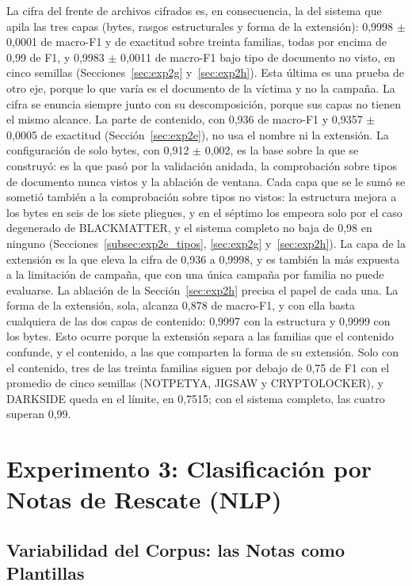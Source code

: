 La cifra del frente de archivos cifrados es, en consecuencia, la del sistema que apila las tres capas (bytes, rasgos estructurales y forma de la extensión): 0,9998 $\pm$ 0,0001 de macro-F1 y de exactitud sobre treinta familias, todas por encima de 0,99 de F1, y 0,9983 $\pm$ 0,0011 de macro-F1 bajo tipo de documento no visto, en cinco semillas (Secciones~\ref{sec:exp2g} y~\ref{sec:exp2h}). Esta última es una prueba de otro eje, porque lo que varía es el documento de la víctima y no la campaña. La cifra se enuncia siempre junto con su descomposición, porque sus capas no tienen el mismo alcance. La parte de contenido, con 0,936 de macro-F1 y 0,9357 $\pm$ 0,0005 de exactitud (Sección~\ref{sec:exp2e}), no usa el nombre ni la extensión. La configuración de solo bytes, con 0,912 $\pm$ 0,002, es la base sobre la que se construyó: es la que pasó por la validación anidada, la comprobación sobre tipos de documento nunca vistos y la ablación de ventana. Cada capa que se le sumó se sometió también a la comprobación sobre tipos no vistos: la estructura mejora a los bytes en seis de los siete pliegues, y en el séptimo los empeora solo por el caso degenerado de BLACKMATTER, y el sistema completo no baja de 0,98 en ninguno (Secciones~\ref{subsec:exp2e_tipos}, \ref{sec:exp2g} y~\ref{sec:exp2h}). La capa de la extensión es la que eleva la cifra de 0,936 a 0,9998, y es también la más expuesta a la limitación de campaña, que con una única campaña por familia no puede evaluarse. La ablación de la Sección~\ref{sec:exp2h} precisa el papel de cada una. La forma de la extensión, sola, alcanza 0,878 de macro-F1, y con ella basta cualquiera de las dos capas de contenido: 0,9997 con la estructura y 0,9999 con los bytes. Esto ocurre porque la extensión separa a las familias que el contenido confunde, y el contenido, a las que comparten la forma de su extensión. Solo con el contenido, tres de las treinta familias siguen por debajo de 0,75 de F1 con el promedio de cinco semillas (NOTPETYA, JIGSAW y CRYPTOLOCKER), y DARKSIDE queda en el límite, en 0,7515; con el sistema completo, las cuatro superan 0,99.

\section{Experimento 3: Clasificación por Notas de Rescate (NLP)}
\label{sec:exp3}

\subsection{Variabilidad del Corpus: las Notas como Plantillas}
\label{subsec:res_variabilidad}

